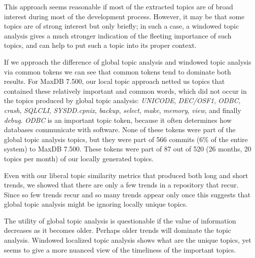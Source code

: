 \documentclass[times, 10pt,twocolumn]{article}
\begin{document}
This approach seems reasonable if most of the extracted topics are of
broad interest during most of the development process.  However, it
may be that some topics are of strong interest but only briefly; in
such a case, a windowed topic analysis gives a much stronger
indication of the fleeting importance of such topics, and can help to
put such a topic into its proper context.


If we approach the difference of global topic analysis and windowed
topic analysis via common tokens we can see that common tokens tend to
dominate both results. For MaxDB 7.500, our local topic approach
netted us topics that contained these relatively important and common
words, which did not occur in the topics produced by global topic
analysis: \emph{UNICODE}, \emph{DEC/OSF1}, \emph{ODBC}, \emph{crash},
\emph{SQLCLI}, \emph{SYSDD.cpnix}, \emph{backup}, \emph{select},
\emph{make}, \emph{memory}, \emph{view}, and finally
\emph{debug}. \emph{ODBC} is an important topic token, because it
often determines how databases communicate with software. None of
these tokens were part of the global topic analysis topics, but they
were part of 566 commits (6\% of the entire system) to MaxDB
7.500. These tokens were part of 87 out of 520 (26 months, 20 topics
per month) of our locally generated topics.


Even with our liberal topic similarity metrics that produced both long
and short trends, we showed that there are only a few trends in a
repository that recur. Since so few trends recur and so many trends
appear only once this suggests that global topic analysis might be
ignoring locally unique topics.

The utility of global topic analysis is questionable if the value of
information decreases as it becomes older. Perhaps older trends will
dominate the topic analysis. Windowed localized topic analysis shows
what are the unique topics, yet seems to give a more nuanced view of
the timeliness of the important topics.
\end{document}
